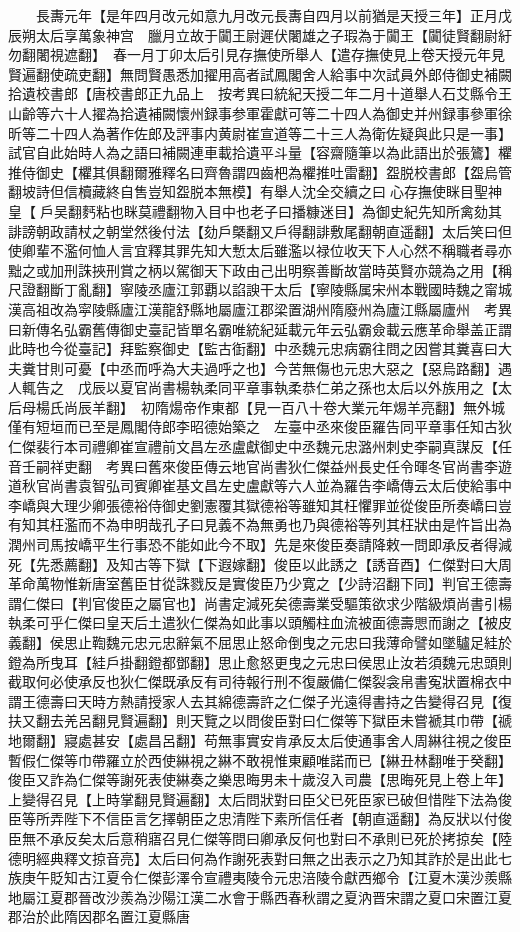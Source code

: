 　　長夀元年【是年四月改元如意九月改元長夀自四月以前猶是天授三年】正月戊辰朔太后享萬象神宫　臘月立故于闐王尉遲伏闍雄之子瑕為于闐王【闐徒賢翻尉紆勿翻闍視遮翻】　春一月丁卯太后引見存撫使所舉人【遣存撫使見上卷天授元年見賢遍翻使疏吏翻】無問賢愚悉加擢用高者試鳳閣舍人給事中次試員外郎侍御史補闕拾遺校書郎【唐校書郎正九品上　按考異曰統紀天授二年二月十道舉人石艾縣令王山齡等六十人擢為拾遺補闕懷州録事参軍霍獻可等二十四人為御史并州録事參軍徐昕等二十四人為著作佐郎及評事内黄尉崔宣道等二十三人為衛佐疑與此只是一事】試官自此始時人為之語曰補闕連車載拾遺平斗量【容齋隨筆以為此語出於張鷟】欋推侍御史【欋其俱翻爾雅釋名曰齊魯謂四齒杷為欋推吐雷翻】盌脱校書郎【盌烏管翻坡詩但信櫝藏終自售豈知盌脱本無模】有舉人沈全交續之曰心存撫使眯目聖神皇【戶吴翻麫粘也眯莫禮翻物入目中也老子曰播糠迷目】為御史紀先知所禽劾其誹謗朝政請杖之朝堂然後付法【劾戶槩翻又戶得翻誹敷尾翻朝直遥翻】太后笑曰但使卿輩不濫何恤人言宜釋其罪先知大慙太后雖濫以禄位收天下人心然不稱職者尋亦黜之或加刑誅挾刑賞之柄以駕御天下政由己出明察善斷故當時英賢亦競為之用【稱尺證翻斷丁亂翻】寧陵丞廬江郭覇以諂諛干太后【寧陵縣属宋州本戰國時魏之甯城漢高祖改為寜陵縣廬江漢龍舒縣地屬廬江郡梁置湖州隋廢州為廬江縣屬廬州　考異曰新傳名弘霸舊傳御史臺記皆單名霸唯統紀延載元年云弘霸僉載云應革命舉盖正謂此時也今從臺記】拜監察御史【監古衘翻】中丞魏元忠病霸往問之因嘗其糞喜曰大夫糞甘則可憂【中丞而呼為大夫過呼之也】今苦無傷也元忠大惡之【惡烏路翻】遇人輒告之　戊辰以夏官尚書楊執柔同平章事執柔恭仁弟之孫也太后以外族用之【太后母楊氏尚辰羊翻】　初隋煬帝作東都【見一百八十卷大業元年焬羊亮翻】無外城僅有短垣而已至是鳳閣侍郎李昭德始築之　左臺中丞來俊臣羅告同平章事任知古狄仁傑裴行本司禮卿崔宣禮前文昌左丞盧獻御史中丞魏元忠潞州刺史李嗣真謀反【任音壬嗣祥吏翻　考異曰舊來俊臣傳云地官尚書狄仁傑益州長史任令暉冬官尚書李遊道秋官尚書袁智弘司賓卿崔基文昌左史盧獻等六人並為羅告李嶠傳云太后使給事中李嶠與大理少卿張德裕侍御史劉憲覆其獄德裕等雖知其枉懼罪並從俊臣所奏嶠曰豈有知其枉濫而不為申明哉孔子曰見義不為無勇也乃與德裕等列其枉狀由是忤旨出為潤州司馬按嶠平生行事恐不能如此今不取】先是來俊臣奏請降敕一問即承反者得減死【先悉薦翻】及知古等下獄【下遐嫁翻】俊臣以此誘之【誘音酉】仁傑對曰大周革命萬物惟新唐室舊臣甘從誅戮反是實俊臣乃少寛之【少詩沼翻下同】判官王德壽謂仁傑曰【判官俊臣之屬官也】尚書定減死矣德壽業受驅策欲求少階級煩尚書引楊執柔可乎仁傑曰皇天后土遣狄仁傑為如此事以頭觸柱血流被面德壽愳而謝之【被皮義翻】侯思止鞫魏元忠元忠辭氣不屈思止怒命倒曳之元忠曰我薄命譬如墜驢足絓於鐙為所曳耳【絓戶掛翻鐙都鄧翻】思止愈怒更曳之元忠曰侯思止汝若須魏元忠頭則截取何必使承反也狄仁傑既承反有司待報行刑不復嚴備仁傑裂衾帛書寃狀置棉衣中謂王德壽曰天時方熱請授家人去其綿德壽許之仁傑子光遠得書持之告變得召見【復扶又翻去羌呂翻見賢遍翻】則天覽之以問俊臣對曰仁傑等下獄臣未嘗褫其巾帶【禠地爾翻】寢處甚安【處昌呂翻】苟無事實安肯承反太后使通事舍人周綝往視之俊臣暫假仁傑等巾帶羅立於西使綝視之綝不敢視惟東顧唯諾而已【綝丑林翻唯于癸翻】俊臣又詐為仁傑等謝死表使綝奏之樂思晦男未十歲沒入司農【思晦死見上卷上年】上變得召見【上時掌翻見賢遍翻】太后問狀對曰臣父已死臣家已破但惜陛下法為俊臣等所弄陛下不信臣言乞擇朝臣之忠清陛下素所信任者【朝直遥翻】為反狀以付俊臣無不承反矣太后意稍寤召見仁傑等問曰卿承反何也對曰不承則已死於拷掠矣【陸德明經典釋文掠音亮】太后曰何為作謝死表對曰無之出表示之乃知其詐於是出此七族庚午貶知古江夏令仁傑彭澤令宣禮夷陵令元忠涪陵令獻西鄉令【江夏木漢沙羨縣地屬江夏郡晉改沙羨為沙陽江漢二水會于縣西春秋謂之夏汭晋宋謂之夏口宋置江夏郡治於此隋因郡名置江夏縣唐